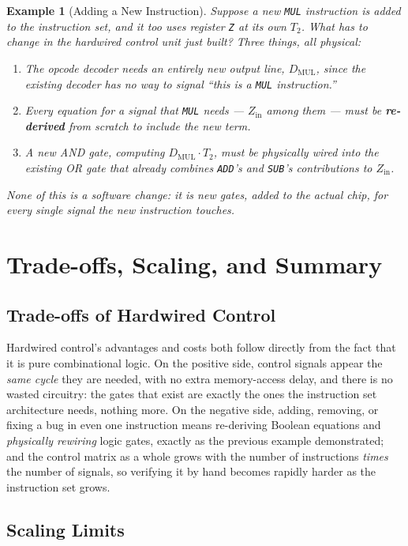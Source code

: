 \documentclass[11pt]{article}
\newtheorem{example}{Example}[section]
\begin{document}
\begin{example}[Adding a New Instruction]
Suppose a new \texttt{MUL} instruction is added to the instruction set, and it too uses register \texttt{Z} at its own $T_2$. What has to change in the hardwired control unit just built? Three things, all physical:
\begin{enumerate}
  \item The opcode decoder needs an entirely new output line, $D_{\text{MUL}}$, since the existing decoder has no way to signal ``this is a \texttt{MUL} instruction.''
  \item Every equation for a signal that \texttt{MUL} needs --- $Z_{\text{in}}$ among them --- must be \textbf{re-derived} from scratch to include the new term.
  \item A new AND gate, computing $D_{\text{MUL}} \cdot T_2$, must be physically wired into the existing OR gate that already combines \texttt{ADD}'s and \texttt{SUB}'s contributions to $Z_{\text{in}}$.
\end{enumerate}
None of this is a software change: it is new gates, added to the actual chip, for every single signal the new instruction touches.
\end{example}

\section{Trade-offs, Scaling, and Summary}

\subsection{Trade-offs of Hardwired Control}

Hardwired control's advantages and costs both follow directly from the fact that it is pure combinational logic. On the positive side, control signals appear the \emph{same cycle} they are needed, with no extra memory-access delay, and there is no wasted circuitry: the gates that exist are exactly the ones the instruction set architecture needs, nothing more. On the negative side, adding, removing, or fixing a bug in even one instruction means re-deriving Boolean equations and \emph{physically rewiring} logic gates, exactly as the previous example demonstrated; and the control matrix as a whole grows with the number of instructions \emph{times} the number of signals, so verifying it by hand becomes rapidly harder as the instruction set grows.

\subsection{Scaling Limits}
\end{document}
